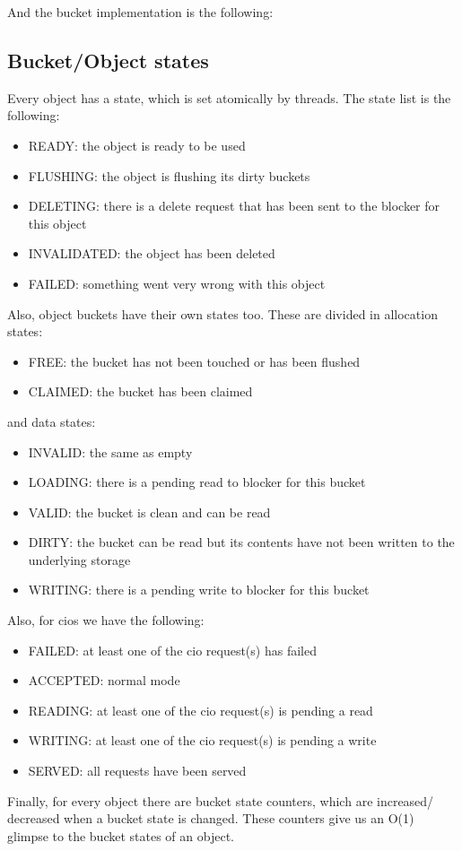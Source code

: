 And the bucket implementation is the following:


\subsection{Bucket/Object states}

Every object has a state, which is set atomically by threads. The state list is
the following:

\begin{itemize}
	\item READY: the object is ready to be used
	\item FLUSHING: the object is flushing its dirty buckets
	\item DELETING: there is a delete request that has been sent to the 
		blocker for this object
	\item INVALIDATED: the object has been deleted
	\item FAILED: something went very wrong with this object
\end{itemize}

Also, object buckets have their own states too. These are divided in allocation 
states:

\begin{itemize}
	\item FREE: the bucket has not been touched or has been flushed
	\item CLAIMED: the bucket has been claimed
\end{itemize}

and data states:

\begin{itemize}
	\item INVALID: the same as empty
	\item LOADING: there is a pending read to blocker for this bucket
	\item VALID: the bucket is clean and can be read
	\item DIRTY: the bucket can be read but its contents have not been
		written to the underlying storage
	\item WRITING: there is a pending write to blocker for this bucket
\end{itemize}

Also, for cios we have the following:

\begin{itemize}
	\item FAILED: at least one of the cio request(s) has failed
	\item ACCEPTED: normal mode
	\item READING: at least one of the cio request(s) is pending a read
	\item WRITING: at least one of the cio request(s) is pending a write
	\item SERVED: all requests have been served
\end{itemize}


Finally, for every object there are bucket state counters, which are increased/
decreased when a bucket state is changed. These counters give us an O(1)
glimpse to the bucket states of an object.


